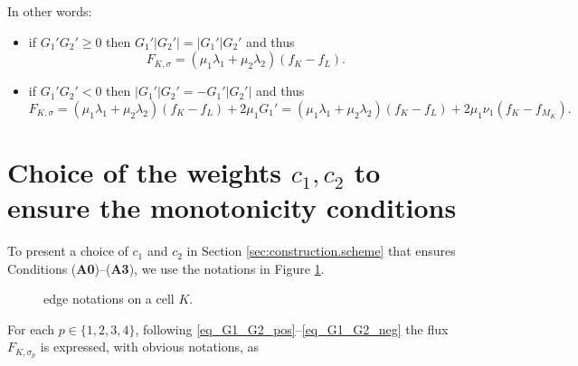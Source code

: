 \documentclass[final,11pt]{elsarticle}
\newcounter{bla}
\begin{document}
In other words:
\begin{itemize}
\item if $G_1'G_2'\geq 0$ then $G_1'|G_2'|=|G_1'|G_2'$ and thus
\begin{equation*}
F_{K,\sigma}=(\mu_1\lambda_1+\mu_2\lambda_2)(f_K-f_L).
\end{equation*}
\item if $G_1'G_2' <0$ then $|G_1'|G_2'=-G_1'|G_2'|$ and thus 
\begin{equation*}
F_{K,\sigma}=(\mu_1\lambda_1+\mu_2\lambda_2)(f_K-f_L)+2\mu_1G_1'
=(\mu_1\lambda_1+\mu_2\lambda_2)(f_K-f_L)+2\mu_1\nu_1(f_K-f_{M_K}).
\end{equation*}
\end{itemize}

\section{Choice of the weights $c_1,c_2$ to ensure the monotonicity conditions}\label{sec:appenB}

To present a choice of $c_1$ and $c_2$ in Section \ref{sec:construction.scheme} that ensures Conditions (\textbf{A0})--(\textbf{A3}), we use the notations in Figure \ref{fig_cell_sigma}.
\begin{figure}[ht!]
    \centering
    \caption{edge notations on a cell $K$.}
    \label{fig_cell_sigma}
\end{figure}
For each $p\in\{1,2,3,4\}$, following \eqref{eq_G1_G2_pos}--\eqref{eq_G1_G2_neg} the flux $F_{K,\sigma_p}$ is expressed, with obvious notations, as
\end{document}
